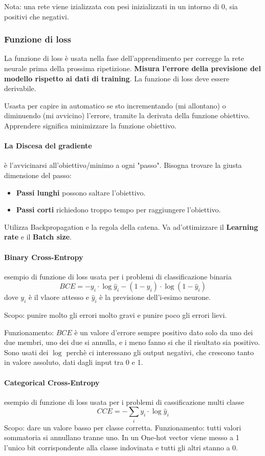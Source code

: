 Nota: una rete viene izializzata con pesi inizializzati in un intorno di 0, sia positivi che negativi.
\subsubsection{Funzione di loss}
La funzione di loss è usata nella fase dell'apprendimento per corregge la rete neurale prima della prossima ripetizione. \textbf{Misura l'errore della previsione del modello rispetto ai dati di training}. La funzione di loss deve essere derivabile.

Usasta per capire in automatico se sto incrementando (mi allontano) o diminuendo (mi avvicino) l'errore, tramite la derivata della funzione obiettivo. Apprendere significa minimizzare la funzione obiettivo.
\paragraph{La Discesa del gradiente} è l'avvicinarsi all'obiettivo/minimo a ogni "passo". Bisogna trovare la giusta dimensione del passo:
\begin{itemize}
	\item \textbf{Passi lunghi} possono saltare l'obiettivo.
	\item \textbf{Passi corti} richiedono troppo tempo per raggiungere l'obiettivo.
\end{itemize}
Utilizza Backpropagation e la regola della catena. Va ad'ottimizzare il \textbf{Learning rate} e il \textbf{Batch size}.
\paragraph{Binary Cross-Entropy} esempio di funzione di loss usata per i problemi di classificazione binaria \[BCE=-y_i\cdot \log\hat{y}_i-(1-y_i)\cdot\log(1-\hat{y}_i)\] dove $y_i$ è il vlaore attesso e $\hat{y}_i$ è la previsione dell'i-esimo neurone.

Scopo: punire molto gli errori molto gravi e punire poco gli errori lievi.

Funzionamento: $BCE$ è un valore d'errore sempre positivo dato solo da uno dei due membri, uno dei due si annulla, e i meno fanno si che il risultato sia positivo. Sono usati dei $\log$ perchè ci interessano gli output negativi, che crescono tanto in valore assoluto, dati dagli input tra 0 e 1.
\paragraph{Categorical Cross-Entropy} esempio di funzione di loss usata per i problemi di cassificazione multi classe \[CCE=-\sum_iy_i\cdot \log\hat{y}_i\]
Scopo: dare un valore basso per classe corretta.
Funzionamento: tutti valori sommatoria si annullano tranne uno. In un One-hot vector viene messo a 1 l'unico bit corrispondente alla classe indovinata e tutti gli altri stanno a 0.
